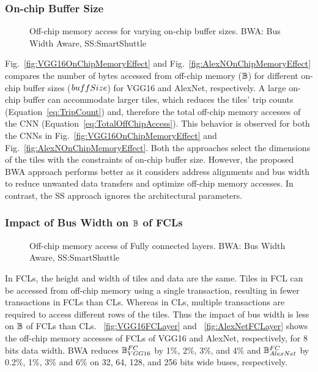 \subsubsection{On-chip Buffer Size}
\begin{figure}[htb]
	\centering
	\hfil
	\hfil
	\caption{Off-chip memory access for varying on-chip buffer sizes. BWA: Bus Width Aware, SS:SmartShuttle}
	\label{fig:EffectOfVaryingOnChipBuffer}
	\vspace{-1.0em}
\end{figure}
Fig.~\ref{fig:VGG16OnChipMemoryEffect} and Fig.~\ref{fig:AlexNOnChipMemoryEffect} compares the number of bytes accessed from off-chip memory ($\mathbb{B}$) for different on-chip buffer sizes ($buffSize$) for VGG16 and AlexNet, respectively. A large on-chip buffer can accommodate larger tiles, which reduces the tiles' trip counts (Equation~\ref{eq:TripCount}) and, therefore the total off-chip memory accesses of the CNN (Equation~\ref{eq:TotalOffChipAccess}). This behavior is observed for both the CNNs in Fig.~\ref{fig:VGG16OnChipMemoryEffect} and Fig.~\ref{fig:AlexNOnChipMemoryEffect}. Both the approaches select the dimensions of the tiles  with the constraints of on-chip buffer size. However, the proposed BWA approach performs better as it considers address alignments and bus width to reduce unwanted data transfers and optimize off-chip memory accesses. In contrast, the SS approach ignores the architectural parameters.
\subsubsection{Impact of Bus Width on $\mathbb{B}$ of FCLs}
\begin{figure}[htb]
	\centering
	\hfil
	\hfil	
	\caption{Off-chip memory access of Fully connected layers. BWA: Bus Width Aware, SS:SmartShuttle}
	\label{fig:EffectOnFC}
	\vspace{-1.0em}
\end{figure}
In FCLs, the height and width of tiles and data are the same. Tiles in FCL can be accessed from off-chip memory using a single transaction, resulting in fewer transactions in FCLs than CLs. Whereas in CLs, multiple transactions are required to access different rows of the tiles. Thus the impact of bus width is less on $\mathbb{B}$ of FCLs than CLs. \figurename~\ref{fig:VGG16FCLayer} and \figurename~\ref{fig:AlexNetFCLayer} shows the off-chip memory accesses of FCLs of VGG16 and AlexNet, respectively, for 8 bits data width. BWA reduces $\mathbb{B}_{VGG16}^{FC}$ by 1\%, 2\%, 3\%, and 4\% and $\mathbb{B}_{AlexNet}^{FC}$ by 0.2\%, 1\%, 3\% and 6\% on 32, 64, 128, and 256 bits wide buses, respectively.
